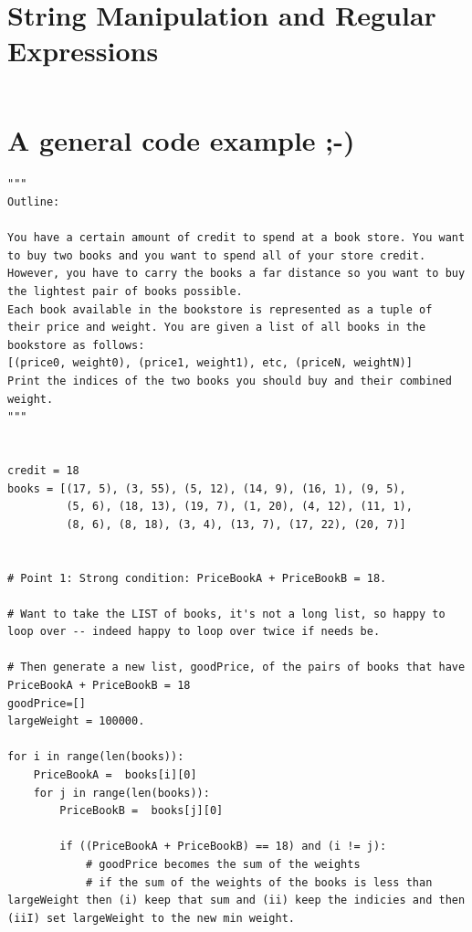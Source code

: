 \documentclass[11pt,a4paper]{article}
\begin{document}
\newpage
\section{String Manipulation and Regular Expressions}
\begin{lstlisting}

\end{lstlisting}





\newpage
\section{A general code example ;-)} 

\begin{lstlisting}
"""
Outline:

You have a certain amount of credit to spend at a book store. You want to buy two books and you want to spend all of your store credit. However, you have to carry the books a far distance so you want to buy the lightest pair of books possible.
Each book available in the bookstore is represented as a tuple of their price and weight. You are given a list of all books in the bookstore as follows:
[(price0, weight0), (price1, weight1), etc, (priceN, weightN)]
Print the indices of the two books you should buy and their combined weight.
"""
    
    
credit = 18
books = [(17, 5), (3, 55), (5, 12), (14, 9), (16, 1), (9, 5),
         (5, 6), (18, 13), (19, 7), (1, 20), (4, 12), (11, 1),
         (8, 6), (8, 18), (3, 4), (13, 7), (17, 22), (20, 7)]


# Point 1: Strong condition: PriceBookA + PriceBookB = 18. 

# Want to take the LIST of books, it's not a long list, so happy to loop over -- indeed happy to loop over twice if needs be. 

# Then generate a new list, goodPrice, of the pairs of books that have PriceBookA + PriceBookB = 18
goodPrice=[]
largeWeight = 100000.

for i in range(len(books)):
    PriceBookA =  books[i][0] 
    for j in range(len(books)):
        PriceBookB =  books[j][0] 
        
        if ((PriceBookA + PriceBookB) == 18) and (i != j):
            # goodPrice becomes the sum of the weights 
            # if the sum of the weights of the books is less than largeWeight then (i) keep that sum and (ii) keep the indicies and then (iiI) set largeWeight to the new min weight. 
            

\end{lstlisting}
\end{document}
